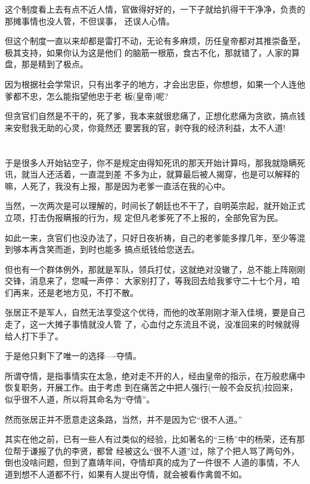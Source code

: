 \documentclass[11pt,a4paper,onecolumn]{article}
\begin{document}
这个制度看上去有点不近人情，官做得好好的，一下子就给扒得干干净净，负责的那摊事情也没人管，不但误事，
还误人心情。

但这个制度一直以来却都是雷打不动，无论有多麻烦，历任皇帝都对其推崇备至，极其支持，如果你认为这是他们
的脑筋一根筋，食古不化，那就错了，人家的算盘，那是精到了极点。

因为根据社会学常识，只有出孝子的地方，才会出忠臣，你想想，如果一个人连他爹都不忠，怎么能指望他忠于老
板(皇帝)呢?

但贪官们自然是不干的，死了爹，我本来就很悲痛了，正想化悲痛为贪欲，搞点钱来安慰我无助的心灵，你竟然还
要罢我的官，剥夺我的经济利益，太不人道!

\section[\thesection]{}

于是很多人开始钻空子，你不是规定由得知死讯的那天开始计算吗，那我就隐瞒死讯，就当人还活着，一直混到差
不多为止，就算最后被人揭穿，也是可以解释的嘛，人死了，我没有上报，那是因为老爹一直活在我的心中。

当然，一次两次是可以理解的，时间长了朝廷也不干了，自明英宗起，就开始正式立项，打击伪报瞒报的行为，规
定但凡老爹死了不上报的，全部免官为民。

如此一来，贪官们也没办法了，只好日夜祈祷，自己的老爹能多撑几年，至少等混到够本再含笑而逝，到时也能多
搞点纸钱给您送去。

但也有一个群体例外，那就是军队，领兵打仗，这就绝对没辙了，总不能上阵刚刚交锋，消息来了，您喊一声停：
大家别打了，等我回去给我爹守二十七个月，咱们再来，还是老地方见，不打不散。

张居正不是军人，自然无法享受这个优待，而他的改革刚刚才渐入佳境，要是自己走了，这一大摊子事情就没人管
了，心血付之东流且不说，没准回来的时候就得给人打下手了。

于是他只剩下了唯一的选择----夺情。

所谓夺情，是指事情实在太急，绝对走不开的人，经由皇帝的指示，在万般悲痛中恢复职务，开展工作。由于考虑
到在痛苦之中把人强行(一般不会反抗)拉回来，似乎很不人道，所以将其命名为``夺情''。

然而张居正并不愿意走这条路，当然，并不是因为它``很不人道。''

其实在他之前，已有一些人有过类似的经验，比如著名的``三杨''中的杨荣，还有那位帮于谦报了仇的李贤，都曾
经被这么``很不人道''过，除了个把人骂了两句外，倒也没啥问题，但到了嘉靖年间，夺情却真的成为了一件很不
人道的事情，不人道到想不人道都不行，如果有人提出夺情，就会被看作禽兽不如。
\end{document}
